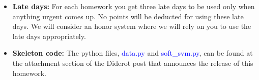 \documentclass{article}
\begin{document}
\begin{itemize}
    \item \textbf{Late days:} For each homework you get three late days to be used only when anything urgent comes up. No points will be deducted for using these late days. We will consider an honor system where we will rely on you to use the late days appropriately.
    
    \item \textbf{Skeleton code:} The python files, \textcolor{blue}{data.py} and \textcolor{blue}{soft\_svm.py}, can be found at the attachment section of the Diderot post that announces the release of this homework.
\end{itemize}




\newpage

\end{document}
